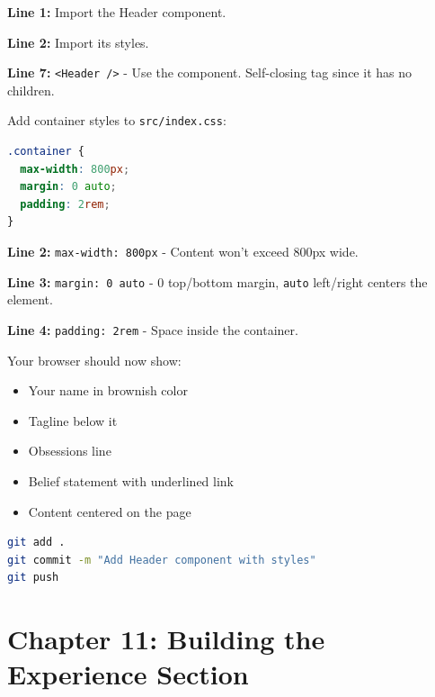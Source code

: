 \documentclass[12pt,a4paper]{article}
\begin{document}
\begin{explanation}
\textbf{Line 1:} Import the Header component.

\textbf{Line 2:} Import its styles.

\textbf{Line 7:} \texttt{<Header />} - Use the component. Self-closing tag since it has no children.
\end{explanation}

Add container styles to \texttt{src/index.css}:

\begin{lstlisting}[language=CSS,caption={Add to src/index.css}]
.container {
  max-width: 800px;
  margin: 0 auto;
  padding: 2rem;
}
\end{lstlisting}

\begin{explanation}
\textbf{Line 2:} \texttt{max-width: 800px} - Content won't exceed 800px wide.

\textbf{Line 3:} \texttt{margin: 0 auto} - 0 top/bottom margin, \texttt{auto} left/right centers the element.

\textbf{Line 4:} \texttt{padding: 2rem} - Space inside the container.
\end{explanation}

\begin{checkpoint}
Your browser should now show:
\begin{itemize}
    \item[$\square$] Your name in brownish color
    \item[$\square$] Tagline below it
    \item[$\square$] Obsessions line
    \item[$\square$] Belief statement with underlined link
    \item[$\square$] Content centered on the page
\end{itemize}
\end{checkpoint}

\begin{gitcommit}
\begin{lstlisting}[language=bash]
git add .
git commit -m "Add Header component with styles"
git push
\end{lstlisting}
\end{gitcommit}

\section{Chapter 11: Building the Experience Section}
\end{document}
